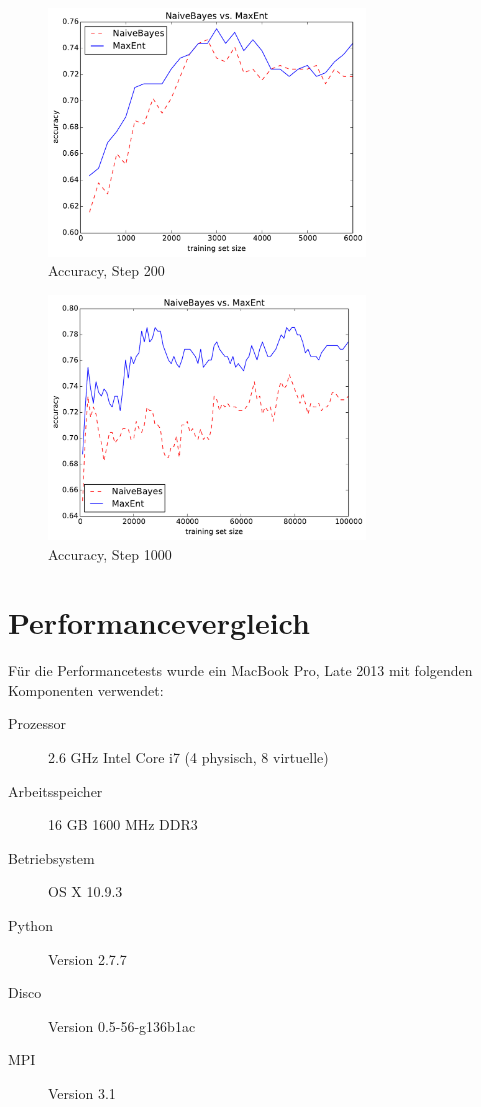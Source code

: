 \documentclass[12pt, oneside]{report}   	%
\begin{document}
\begin{figure}[htbp]
\begin{center}
\includegraphics[width=0.75\textwidth]{bilder/cmp_nb_vs_me_S200_M6000.pdf}
\caption{Accuracy, Step 200}
\label{img:acc2}
\end{center}
\end{figure}

\begin{figure}[htbp]
\begin{center}
\includegraphics[width=0.75\textwidth]{bilder/cmp_nb_vs_me_S1000_M100000.pdf}
\caption{Accuracy, Step 1000}
\label{img:acc3}
\end{center}
\end{figure}


\section{Performancevergleich}
Für die Performancetests wurde ein MacBook Pro, Late 2013 mit folgenden Komponenten verwendet:
\begin{description}
\item[ Prozessor] 2.6 GHz Intel Core i7 (4 physisch, 8 virtuelle)
\item[ Arbeitsspeicher] 16 GB 1600 MHz DDR3
\item[ Betriebsystem] OS X 10.9.3
\item[ Python] Version 2.7.7
\item[ Disco ] Version 0.5-56-g136b1ac
\item[ MPI ] Version 3.1
\end{description}
\end{document}
